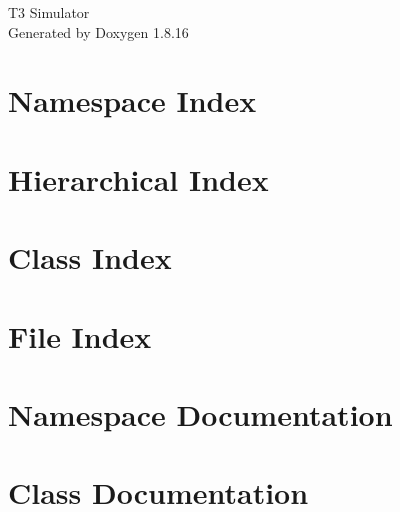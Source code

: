 \let\mypdfximage\pdfximage\def\pdfximage{\immediate\mypdfximage}\documentclass[twoside]{book}
\newcommand{\+}{\discretionary{\mbox{\scriptsize$\hookleftarrow$}}{}{}}
\newcommand{\clearemptydoublepage}{%
  \newpage{\pagestyle{empty}\cleardoublepage}%
}
\begin{document}
\hypersetup{pageanchor=false,
             bookmarksnumbered=true,
             pdfencoding=unicode
            }
\begin{titlepage}
\vspace*{7cm}
\begin{center}%
{\Large T3 Simulator }\\
\vspace*{1cm}
{\large Generated by Doxygen 1.8.16}\\
\end{center}
\end{titlepage}
\clearemptydoublepage
{}
\tableofcontents
\clearemptydoublepage
{}
\hypersetup{pageanchor=true}

\chapter{Namespace Index}

\chapter{Hierarchical Index}

\chapter{Class Index}

\chapter{File Index}

\chapter{Namespace Documentation}





\chapter{Class Documentation}


















\end{document}
